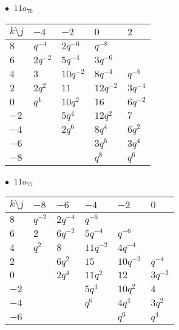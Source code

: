 \begin{minipage}{\linewidth}
$\bullet\ $ $11a_{76}$ \vspace{0.5em} \\
\begin{tabular}{l|llll}
$k \setminus j$ & $-4$ & $-2$ & $0$ & $2$ \\
\hline
$8$ & $q^{-4}$ & $2q^{-6}$ & $q^{-8}$ &  \\
$6$ & $2q^{-2}$ & $5q^{-4}$ & $3q^{-6}$ &  \\
$4$ & $3$ & $10q^{-2}$ & $8q^{-4}$ & $q^{-6}$ \\
$2$ & $2q^{2}$ & $11$ & $12q^{-2}$ & $3q^{-4}$ \\
$0$ & $q^{4}$ & $10q^{2}$ & $16$ & $6q^{-2}$ \\
$-2$ &  & $5q^{4}$ & $12q^{2}$ & $7$ \\
$-4$ &  & $2q^{6}$ & $8q^{4}$ & $6q^{2}$ \\
$-6$ &  &  & $3q^{6}$ & $3q^{4}$ \\
$-8$ &  &  & $q^{8}$ & $q^{6}$ \\
\end{tabular}
\vspace{2em}
\end{minipage}
%
\begin{minipage}{\linewidth}
$\bullet\ $ $11a_{77}$ \vspace{0.5em} \\
\begin{tabular}{l|lllll}
$k \setminus j$ & $-8$ & $-6$ & $-4$ & $-2$ & $0$ \\
\hline
$8$ & $q^{-2}$ & $2q^{-4}$ & $q^{-6}$ &  &  \\
$6$ & $2$ & $6q^{-2}$ & $5q^{-4}$ & $q^{-6}$ &  \\
$4$ & $q^{2}$ & $8$ & $11q^{-2}$ & $4q^{-4}$ &  \\
$2$ &  & $6q^{2}$ & $15$ & $10q^{-2}$ & $q^{-4}$ \\
$0$ &  & $2q^{4}$ & $11q^{2}$ & $12$ & $3q^{-2}$ \\
$-2$ &  &  & $5q^{4}$ & $10q^{2}$ & $4$ \\
$-4$ &  &  & $q^{6}$ & $4q^{4}$ & $3q^{2}$ \\
$-6$ &  &  &  & $q^{6}$ & $q^{4}$ \\
\end{tabular}
\vspace{2em}
\end{minipage}
%
